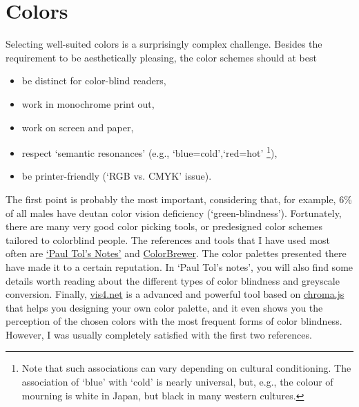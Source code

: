 \chapter{Colors}\label{cha:colors}

Selecting well-suited colors is a surprisingly complex challenge. Besides the requirement to be aesthetically pleasing, the color schemes should at best
\begin{itemize}
	\item be distinct for color-blind readers,
	\item work in monochrome print out,
	\item work on screen and paper,
	\item respect `semantic resonances' \cite{linSelectingSemanticallyResonantColors2013} (e.g., `blue=cold',`red=hot' \footnote{Note that such associations can vary depending on cultural conditioning. The association of `blue' with `cold' is nearly universal, but, e.g., the colour of mourning is white in Japan, but black in many western cultures.}),
	\item be printer-friendly (`RGB vs. CMYK' issue).
\end{itemize}
The first point is probably the most important, considering that, for example, 6\% of all males have deutan color vision deficiency (`green-blindness'). Fortunately, there are many very good color picking tools, or predesigned color schemes tailored to colorblind people.
The references and tools that I have used most often are \href{https://personal.sron.nl/~pault/#sec:greyscale_conversion}{`Paul Tol's Notes'} and \href{https://colorbrewer2.org/#type=sequential&scheme=BuGn&n=3}{ColorBrewer}. 
The color palettes presented there have made it to a certain reputation. In `Paul Tol's notes', you will also find some details worth reading about the different types of color blindness and greyscale conversion.
Finally, \href{https://www.vis4.net/palettes/}{vis4.net} is a advanced and powerful tool based on \href{https://github.com/gka/chroma.js}{chroma.js} that helps you designing your own color palette, and it even shows you the perception of the chosen colors with the most frequent forms of color blindness. However, I was usually completely satisfied with the first two references.

